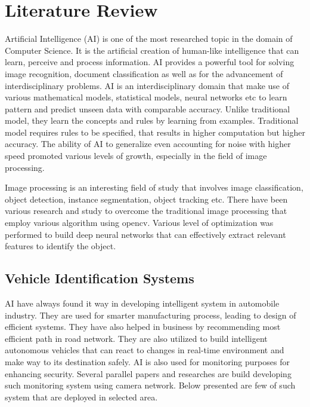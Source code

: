\chapter{Literature Review} 
Artificial Intelligence (AI) is one of the most researched topic in the domain of Computer Science. It is the artificial creation of human-like intelligence that can learn, perceive and process information. AI provides a powerful tool for solving image recognition, document classification as well as for the advancement of interdisciplinary problems. AI is an interdisciplinary domain that make use of various mathematical models, statistical models, neural networks etc to learn pattern and predict unseen data with comparable accuracy. Unlike traditional model, they learn the concepts and rules by learning from examples. Traditional model requires rules to be specified, that results in higher computation but higher accuracy. The ability of AI to generalize even accounting for noise with higher speed promoted various levels of growth, especially in the field of image processing.

Image processing is an interesting field of study that involves image classification, object detection, instance segmentation, object tracking etc. There have been various research and study to overcome the traditional image processing that employ various algorithm using opencv. Various level of optimization was performed to build deep neural networks that can effectively extract relevant features to identify the object.

\section{Vehicle Identification Systems}
AI have always found it way in developing intelligent system in automobile industry. They are used for smarter manufacturing process, leading to design of efficient systems. They have also helped in business by recommending most efficient path in road network. They are also utilized to build intelligent autonomous vehicles that can react to changes in real-time environment and make way to its destination safely. AI is also used for monitoring purposes for enhancing security. Several parallel papers and researches are build developing such monitoring system using camera network. Below presented are few of such system that are deployed in selected area.

